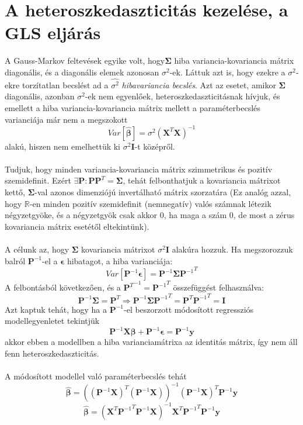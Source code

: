 \documentclass[14p]{report}
\def\pmb{\boldsymbol}
\def\ebeta{\hat{\pmb{\beta}}}
\def\e{\epsilon}
\begin{document}
	\section{A heteroszkedaszticitás kezelése, a GLS eljárás}
	A Gauss-Markov feltevések egyike volt, hogy$\pmb{\Sigma}$ hiba variancia-kovariancia mátrix diagonális, és a diagonális elemek azonosan $\sigma^2$-ek. Láttuk azt is, hogy ezekre a $\sigma^2$-ekre torzítatlan becslést ad a $\widehat{\sigma^2}$ \emph{hibavariancia becslés}. Azt az esetet, amikor $\pmb{\Sigma}$ diagonális, azonban $\sigma^2$-ek nem egyenlőek, heteroszkedaszticitásnak hívjuk, és emellett a hiba variancia-kovariancia mátrix mellett a paraméterbecslés varianciája már nem a megszokott
	\[
		Var[\ebeta] = \sigma^2(\pmb{X}^T\pmb{X})^{-1}
	\]
	alakú, hiszen nem emelhettük ki $\sigma^2\pmb{I}$-t középről.
	\\
	\\
	Tudjuk, hogy minden variancia-kovariancia mátrix szimmetrikus és pozitív szemidefinit. Ezért $\exists \pmb{P} : \pmb{P}\pmb{P}^T = \pmb{\Sigma}$, tehát felbonthatjuk a kovariancia mátrixot kettő, $\pmb{\Sigma}$-val azonos dimenziójú invertálható mátrix szorzatára (Ez analóg azzal, hogy $\mathbb{R}$-en minden pozitív szemidefinit (nemnegatív) valós számnak létezik négyzetgyöke, és a négyzetgyök csak akkor $0$, ha maga a szám $0$, de most a zérus kovariancia mátrix esetétől eltekintünk).
	\\
	\\
	A célunk az, hogy $\pmb{\Sigma}$ kovariancia mátrixot $\sigma^2\pmb{I}$ alakúra hozzuk. Ha megszorozzuk balról $\pmb{P}^{-1}$-el a $\pmb{\e}$ hibatagot, a hiba varianciája:
	\[
		Var[\pmb{P}^{-1}\pmb{\e}] = \pmb{P}^{-1}\pmb{\Sigma}{\pmb{P}^{-1}}^T
	\]
	A felbontásból következően, és a ${\pmb{P}^T}^{-1} = {\pmb{P}^{-1}}^T$ összefüggést felhasználva:
	\[
		\pmb{P}^{-1}\pmb{\Sigma} = \pmb{P}^T \Longrightarrow \pmb{P}^{-1}\pmb{\Sigma}{\pmb{P}^{-1}}^T = \pmb{P}^T{\pmb{P}^{-1}}^T = \pmb{I}
	\]
	Azt kaptuk tehát, hogy ha a $\pmb{P}^{-1}$-el beszorzott módosított regressziós modellegyenletet tekintjük
	\[
		\pmb{P}^{-1}\pmb{X}\pmb{\beta} + \pmb{P}^{-1}\pmb{\e} = \pmb{P}^{-1}\pmb{y}
	\]
	akkor ebben a modellben a hiba varianciamátrixa az identitás mátrix, így nem áll fenn heteroszkedaszticitás.
	\\
	\\
	A módosított modellel való paraméterbecslés tehát
	\[
		\ebeta = ((\pmb{P}^{-1}\pmb{X})^T(\pmb{P}^{-1}\pmb{X}))^{-1}(\pmb{P}^{-1}\pmb{X})^T\pmb{P}^{-1}\pmb{y}
	\]
	\[
		\ebeta = (\pmb{X}^T{\pmb{P}^{-1}}^T\pmb{P}^{-1}\pmb{X})^{-1}\pmb{X}^T{\pmb{P}^{-1}}^T\pmb{P}^{-1}\pmb{y}
	\]
\end{document}
